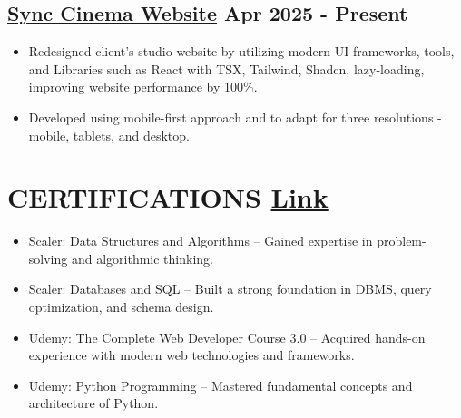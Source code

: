 \documentclass[a4paper,10pt]{article}
\newcommand{\dateright}[1]{\hfill \small \textbf{#1}}
\begin{document}
\subsection*{\href{https://sync-cinema-staging.vercel.app/}{Sync Cinema Website} \dateright{Apr 2025 - Present}}
\begin{itemize}
    \item Redesigned client's studio website by utilizing modern UI frameworks, tools, and Libraries such as React with TSX, Tailwind, Shadcn, lazy-loading, improving website performance by 100\%.
    \item Developed using mobile-first approach and to adapt for three resolutions - mobile, tablets, and desktop.
    
\end{itemize}

\section*{CERTIFICATIONS \dateright{\href{https://drive.google.com/drive/folders/1Q2Wjr-JtRZxGxVz04GJUC_SbUoaoYTW4}{Link}}}


\begin{itemize}
    \item Scaler: Data Structures and Algorithms – Gained expertise in problem-solving and algorithmic thinking.
    \item Scaler: Databases and SQL – Built a strong foundation in DBMS, query optimization, and schema design.  
    \item Udemy: The Complete Web Developer Course 3.0 – Acquired hands-on experience with modern web technologies and frameworks.  
    \item Udemy: Python Programming – Mastered fundamental concepts and architecture of Python.  
\end{itemize}
\end{document}
